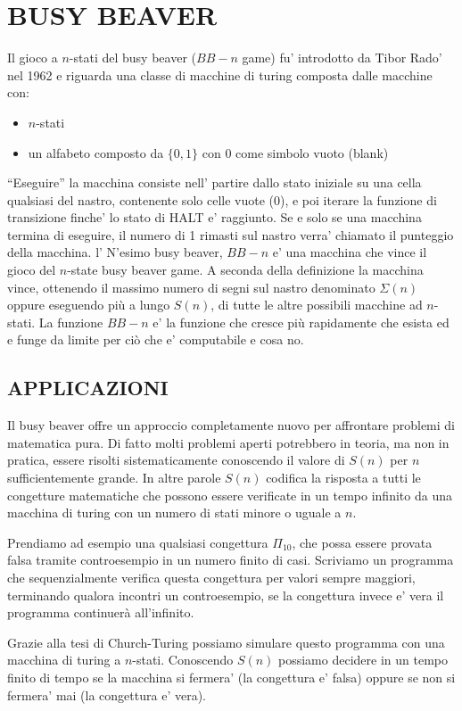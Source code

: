 \documentclass[12pt, a4paper, oneside]{article}
\begin{document}
\section*{BUSY BEAVER}
Il gioco a $n$-stati del busy beaver ($BB-n$ game) fu’ introdotto da Tibor Rado’ nel 1962 e riguarda una classe di macchine di turing composta dalle macchine con:
\begin{itemize}
    \item $n$-stati
    \item un alfabeto composto da $\{0,1\}$ con 0 come simbolo vuoto (blank)
\end{itemize}
``Eseguire'' la macchina consiste nell’ partire dallo stato iniziale su una cella qualsiasi del nastro, contenente solo celle vuote (0), e poi iterare la funzione di transizione finche’ lo stato di HALT e’ raggiunto.
Se e solo se una macchina termina di eseguire, il numero di 1 rimasti sul nastro verra’  chiamato il punteggio della macchina.
l’ N’esimo busy beaver, $BB-n$ e’ una macchina che vince il gioco del $n$-state busy beaver game.
A seconda della definizione la macchina vince, ottenendo il massimo numero di segni sul nastro denominato $\Sigma(n)$ oppure eseguendo più a lungo $S(n)$, di tutte le altre possibili macchine ad $n$-stati.
La funzione $BB-n$ e’ la funzione che cresce più rapidamente che esista ed e funge da limite per ciò che e’ computabile e cosa no. 

\subsection*{APPLICAZIONI}
Il busy beaver offre un approccio completamente nuovo per affrontare problemi di matematica pura.
Di fatto molti problemi aperti potrebbero in teoria, ma non in pratica, essere risolti sistematicamente conoscendo il valore di $S(n)$ per $n$ sufficientemente grande.
In altre parole $S(n)$ codifica la risposta a tutti le congetture matematiche che possono essere verificate in un tempo infinito da una macchina di turing con un numero di stati minore o uguale a $n$.

\medskip
Prendiamo ad esempio una qualsiasi congettura $\Pi_{10}$, che possa essere provata falsa tramite controesempio in un numero finito di casi.
Scriviamo un programma che sequenzialmente verifica questa congettura per valori sempre maggiori, terminando qualora incontri un controesempio, se la congettura invece e’ vera il programma continuerà all’infinito.

Grazie alla tesi di Church-Turing possiamo simulare questo programma con una macchina di turing a $n$-stati.
Conoscendo $S(n)$ possiamo decidere in un tempo finito di tempo se la macchina si fermera’ (la congettura e’ falsa) oppure se non si fermera’ mai (la congettura e’ vera).
\newline
\end{document}
